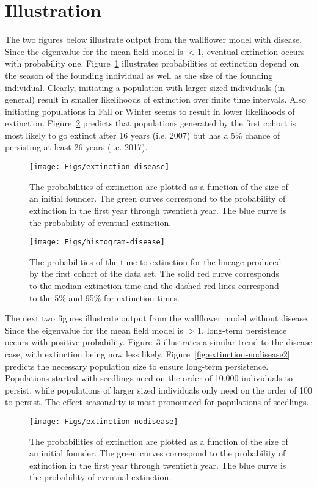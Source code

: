 \documentclass{amsart}
\begin{document}
\section*{Illustration}

The two figures below illustrate output from the wallflower model with disease. Since the eigenvalue for the mean field model is $<1$, eventual extinction occurs with probability one. Figure~\ref{fig:extinction-disease} illustrates probabilities of extinction depend on the season of the founding individual as well as the size of the founding individual. Clearly, initiating a population with larger sized individuals (in general) result in smaller likelihoods of extinction over finite time intervals.  Also initiating populations in Fall or Winter seems to result in lower likelihoods of extinction. Figure~\ref{fig:histogram-disease} predicts that populations generated by the first cohort is most likely to go extinct after 16 years (i.e. 2007) but has a 5\% chance of persisting at least 26 years (i.e. 2017). 

\begin{figure}[h!!!]
\texttt{[image: Figs/extinction-disease]}
\caption{The probabilities of extinction are plotted as a function of the size of an initial founder. The green curves correspond to the probability of extinction in the first year through twentieth year. The blue curve is the probability of eventual extinction.  }\label{fig:extinction-disease}
\end{figure}

\begin{figure}[h!!!]
\texttt{[image: Figs/histogram-disease]}
\caption{The probabilities of the time to extinction for the lineage produced by the first cohort of the data set. The solid red curve corresponds to the median extinction time and the dashed red lines correspond to the 5\% and 95\% for extinction times.  }\label{fig:extinction-disease}\label{fig:histogram-disease}
\end{figure}

The next two figures illustrate output from the wallflower model without disease. Since the eigenvalue for the mean field model is $>1$, long-term persistence occurs with positive probability. Figure~\ref{fig:extinction-nodisease} illustrates a similar trend to the disease case, with extinction being now less likely. Figure~\ref{fig:extinction-nodisease2} predicts the necessary population size to ensure long-term persistence. Populations started with seedlings  need on the order of 10,000 individuals to persist, while populations of larger sized individuals only need on the order of 100 to persist. The effect seasonality is most pronounced for populations of seedlings.  
\begin{figure}[h!!!]
\texttt{[image: Figs/extinction-nodisease]}
\caption{The probabilities of extinction are plotted as a function of the size of an initial founder. The green curves correspond to the probability of extinction in the first year through twentieth year. The blue curve is the probability of eventual extinction.  }\label{fig:extinction-nodisease}
\end{figure}
\end{document}
